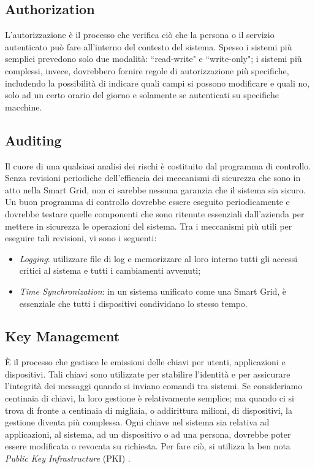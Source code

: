 \subsection{Authorization}
L'autorizzazione è il processo che verifica ciò che la persona o il servizio autenticato può fare all'interno del contesto del sistema. \newline 
Spesso i sistemi più semplici prevedono solo due modalità: ``read-write" e ``write-only"; i sistemi più complessi, invece, dovrebbero fornire regole di autorizzazione più specifiche, includendo la possibilità di indicare quali campi si possono modificare e quali no, solo ad un certo orario del giorno e solamente se autenticati su specifiche macchine.

\subsection{Auditing}
Il cuore di una qualsiasi analisi dei rischi è costituito dal programma di controllo. Senza revisioni periodiche dell'efficacia dei meccanismi di sicurezza che sono in atto nella Smart Grid, non ci sarebbe nessuna garanzia che il sistema sia sicuro. \newline
Un buon programma di controllo dovrebbe essere eseguito periodicamente e dovrebbe testare quelle componenti che sono ritenute essenziali dall'azienda per mettere in sicurezza le operazioni del sistema. Tra i meccanismi più utili per eseguire tali revisioni, vi sono i seguenti:
\begin{itemize}
\item \textit{Logging}: utilizzare file di log e memorizzare al loro interno tutti gli accessi critici al sistema e tutti i cambiamenti avvenuti;
\item \textit{Time Synchronization}: in un sistema unificato come una Smart Grid, è essenziale che tutti i dispositivi condividano lo stesso tempo.
\end{itemize}

\subsection{Key Management}
È il processo che gestisce le emissioni delle chiavi per utenti, applicazioni e dispositivi. Tali chiavi sono utilizzate per stabilire l'identità e per assicurare l'integrità dei messaggi quando si inviano comandi tra sistemi. \newline 
Se consideriamo centinaia di chiavi, la loro gestione è relativamente semplice; ma quando ci si trova di fronte a centinaia di migliaia, o addirittura milioni, di dispositivi, la gestione diventa più complessa. Ogni chiave nel sistema sia relativa ad applicazioni, al sistema, ad un dispositivo o ad una persona, dovrebbe poter essere modificata o revocata su richiesta. 
\newline Per fare ciò, si utilizza la ben nota \textit{Public Key Infrastructure} (PKI) \cite{smartgrid}.

